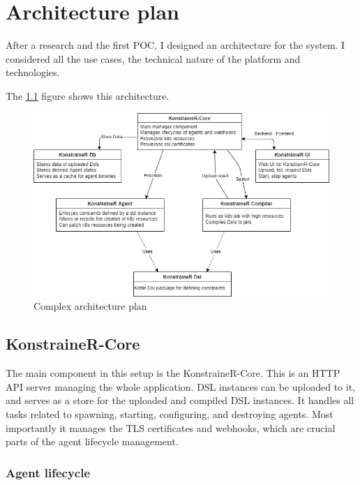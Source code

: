\setlength{\parindent}{0pt}
\setlength{\parskip}{0.6em}

\chapter{Architecture plan}
\label{chap:archPlan}

After a research and the first POC, I designed an architecture for the system. I considered all the use cases, the technical nature of the platform and technologies.

The \ref{fig:comp_arch} figure shows this architecture.

\begin{figure}[h]
    \centering
    \includegraphics[width=130mm, keepaspectratio]{content/75_archPlan/xarch.png}
    \caption{Complex architecture plan}
    \label{fig:comp_arch}
\end{figure}

\section{KonstraineR-Core}

The main component in this setup is the KonstraineR-Core. This is an HTTP API server managing the whole application. DSL instances can be uploaded to it, and serves as a store for the uploaded and compiled DSL instances. It handles all tasks related to spawning, starting, configuring, and destroying agents. Most importantly it manages the TLS certificates and webhooks, which are crucial parts of the agent lifecycle management.

\subsection{Agent lifecycle}

